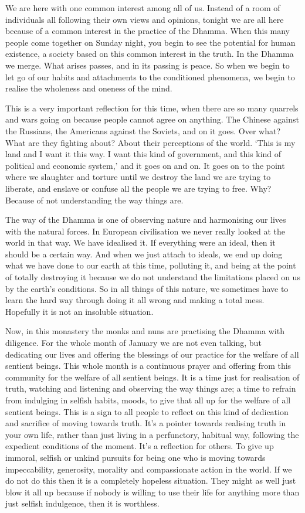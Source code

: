 
We are here with one common interest among all of us. Instead of a room of individuals all following their own views and opinions, tonight we are all here because of a common interest in the practice of the Dhamma. When this many people come together on Sunday night, you begin to see the potential for human existence, a society based on this common interest in the truth. In the Dhamma we merge. What arises passes, and in its passing is peace. So when we begin to let go of our habits and attachments to the conditioned phenomena, we begin to realise the wholeness and oneness of the mind.

This is a very important reflection for this time, when there are so many quarrels and wars going on because people cannot agree on anything. The Chinese against the Russians, the Americans against the Soviets, and on it goes. Over what? What are they fighting about? About their perceptions of the world. `This is my land and I want it this way. I want this kind of government, and this kind of political and economic system,' and it goes on and on. It goes on to the point where we slaughter and torture until we destroy the land we are trying to liberate, and enslave or confuse all the people we are trying to free. Why? Because of not understanding the way things are.

The way of the Dhamma is one of observing nature and harmonising our lives with the natural forces. In European civilisation we never really looked at the world in that way. We have idealised it. If everything were an ideal, then it should be a certain way. And when we just attach to ideals, we end up doing what we have done to our earth at this time, polluting it, and being at the point of totally destroying it because we do not understand the limitations placed on us by the earth's conditions. So in all things of this nature, we sometimes have to learn the hard way through doing it all wrong and making a total mess. Hopefully it is not an insoluble situation.

Now, in this monastery the monks and nuns are practising the Dhamma with diligence. For the whole month of January we are not even talking, but dedicating our lives and offering the blessings of our practice for the welfare of all sentient beings. This whole month is a continuous prayer and offering from this community for the welfare of all sentient beings. It is a time just for realisation of truth, watching and listening and observing the way things are; a time to refrain from indulging in selfish habits, moods, to give that all up for the welfare of all sentient beings. This is a sign to all people to reflect on this kind of dedication and sacrifice of moving towards truth. It's a pointer towards realising truth in your own life, rather than just living in a perfunctory, habitual way, following the expedient conditions of the moment. It's a reflection for others. To give up immoral, selfish or unkind pursuits for being one who is moving towards impeccability, generosity, morality and compassionate action in the world. If we do not do this then it is a completely hopeless situation. They might as well just blow it all up because if nobody is willing to use their life for anything more than just selfish indulgence, then it is worthless.

